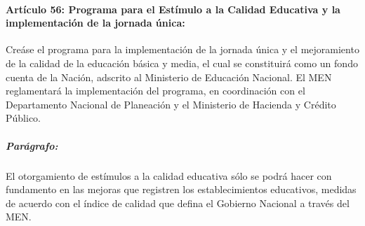 \documentclass[10pt,twoside]{article}
\begin{document}
\paragraph*{Artículo 56: Programa para el Estímulo a la Calidad Educativa y la implementación de la jornada única:} Creáse el programa para la implementación de la jornada única y el mejoramiento de la calidad de la educación básica y media, el cual se constituirá como un fondo cuenta de la Nación, adscrito al Ministerio de Educación Nacional. El MEN reglamentará la implementación del programa, en coordinación con el Departamento Nacional de Planeación y el Ministerio de Hacienda y Crédito Público.
\subparagraph*{Parágrafo:} El otorgamiento de estímulos a la calidad educativa sólo se podrá hacer con fundamento en las mejoras que registren los establecimientos educativos, medidas de acuerdo con el índice de calidad que defina el Gobierno Nacional a través del MEN.
\end{document}
